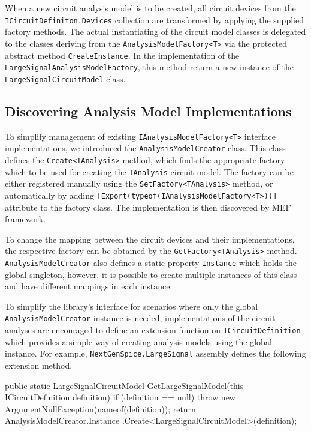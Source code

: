 When a new circuit analysis model is to be created, all circuit devices from the \texttt{ICircuitDefiniton.Devices} collection are transformed by applying the supplied factory methods. The actual instantiating of the circuit model classes is delegated to the classes deriving from the \texttt{AnalysisModelFactory<T>} via the protected abstract method \texttt{CreateInstance}. In the implementation of the \texttt{LargeSignal\+AnalysisModelFactory}, this method return a new instance of the \texttt{LargeSignal\+CircuitModel} class.

\subsection{Discovering Analysis Model Implementations}

To simplify management of existing \texttt{IAnalysisModel\+Factory<T>} interface implementations, we introduced the \texttt{AnalysisModelCreator} class. This class defines the \texttt{Create<TAnalysis>} method, which finds the appropriate factory which to be used for creating the \texttt{TAnalysis} circuit model. The factory can be either registered manually using the \texttt{SetFactory<TAnalysis>} method, or automatically by adding \texttt{[Export(typeof(IAnalysisModelFactory<T>))]} attribute to the factory class. The implementation is then discovered by MEF framework.

To change the mapping between the circuit devices and their implementations, the respective factory can be obtained by the \texttt{GetFactory<TAnalysis>} method. \texttt{AnalysisModelCreator} also defines a static property \texttt{Instance} which holds the global singleton, however, it is possible to create multiple instances of this class and have different mappings in each instance. 

To simplify the library's interface for scenarios where only the global \texttt{Analysis\+ModelCreator} instance is needed, implementations of the circuit analyses are encouraged to define an extension function on \texttt{ICircuit\+Definition} which provides a simple way of creating analysis models using the global instance. For example, \texttt{NextGenSpice.LargeSignal} assembly defines the following extension method.

\begin{csharpcode}
public static LargeSignalCircuitModel
GetLargeSignalModel(this ICircuitDefinition definition)
{
	if (definition == null)
		throw new ArgumentNullException(nameof(definition));
	return AnalysisModelCreator.Instance
		.Create<LargeSignalCircuitModel>(definition);
}
\end{csharpcode}

